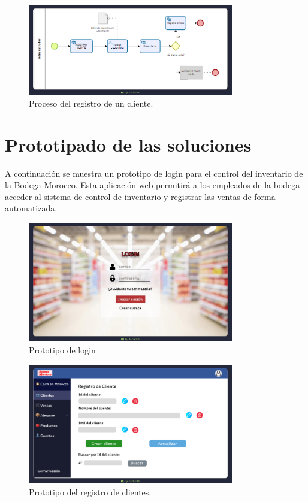 \documentclass{article}
\begin{document}
\begin{figure}[H]
  \centering
  \includegraphics[width=0.8\textwidth]{./assets/p-clientes.png}
  \caption{Proceso del registro de un cliente.}
\end{figure}

\section{Prototipado de las soluciones}

A continuación se muestra un prototipo de login para el control del inventario de la Bodega Morocco. Esta aplicación web permitirá a los empleados de la bodega acceder al sistema de control de inventario y registrar las ventas de forma automatizada.


\begin{figure}[H]
  \centering
  \includegraphics[width=0.8\textwidth]{./assets/login.png}
  \caption{Prototipo de login}
\end{figure}

\begin{figure}[H]
  \centering
  \includegraphics[width=0.8\textwidth]{./assets/registro.png}
  \caption{Prototipo del registro de clientes.}
\end{figure}
\end{document}
